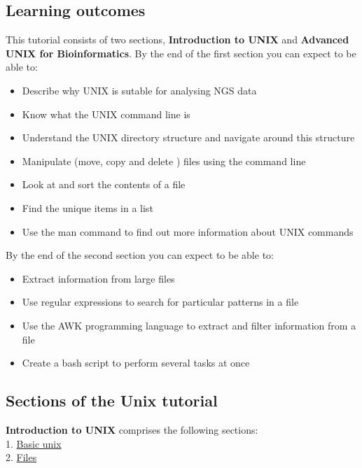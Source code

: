 \documentclass[11pt]{article}
\providecommand{\tightlist}{%
      \setlength{\itemsep}{0pt}\setlength{\parskip}{0pt}}
\begin{document}
\hypertarget{learning-outcomes}{%
\subsection{Learning outcomes}\label{learning-outcomes}}

This tutorial consists of two sections, \textbf{Introduction to UNIX}
and \textbf{Advanced UNIX for Bioinformatics}. By the end of the first
section you can expect to be able to:

\begin{itemize}
\tightlist
\item
  Describe why UNIX is sutable for analysing NGS data
\item
  Know what the UNIX command line is
\item
  Understand the UNIX directory structure and navigate around this
  structure
\item
  Manipulate (move, copy and delete ) files using the command line
\item
  Look at and sort the contents of a file
\item
  Find the unique items in a list
\item
  Use the man command to find out more information about UNIX commands
\end{itemize}

By the end of the second section you can expect to be able to:

\begin{itemize}
\tightlist
\item
  Extract information from large files
\item
  Use regular expressions to search for particular patterns in a file
\item
  Use the AWK programming language to extract and filter information
  from a file
\item
  Create a bash script to perform several tasks at once
\end{itemize}

\hypertarget{sections-of-the-unix-tutorial}{%
\subsection{Sections of the Unix
tutorial}\label{sections-of-the-unix-tutorial}}

\textbf{Introduction to UNIX} comprises the following sections:\\
1. \href{basic.ipynb}{Basic unix}\\
2. \href{files.ipynb}{Files}
\end{document}
